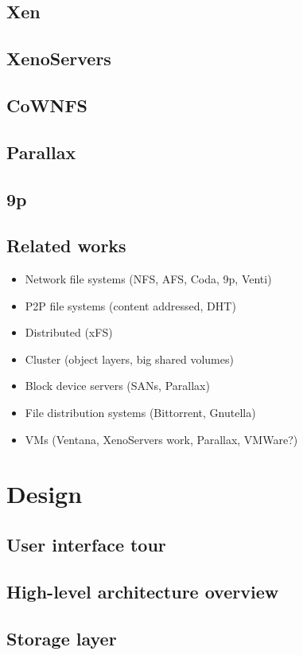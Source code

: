 \documentclass[a4paper]{article}
\begin{document}
\subsection{Xen}
\subsection{XenoServers}
\subsection{CoWNFS}
\subsection{Parallax}
\subsection{9p}
\subsection{Related works}
\begin{itemize}
\item Network file systems (NFS, AFS, Coda, 9p, Venti)
\item P2P file systems (content addressed, DHT)
\item Distributed (xFS)
\item Cluster (object layers, big shared volumes)
\item Block device servers (SANs, Parallax)
\item File distribution systems (Bittorrent, Gnutella)
\item VMs (Ventana, XenoServers work, Parallax, VMWare?)
\end{itemize}


\section{Design}

\subsection{User interface tour}
\subsection{High-level architecture overview}
\subsection{Storage layer}
\end{document}
